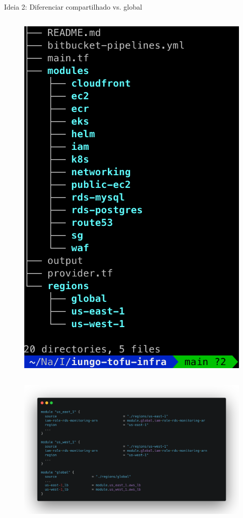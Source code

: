 \documentclass[aspectratio=169]{beamer}
\begin{document}
\begin{frame}{Ideia 2: Diferenciar compartilhado vs. global}
\begin{columns}[T]
\begin{column}[T]{5cm}
\begin{figure}
				\includegraphics[width=0.9\linewidth]{Images/tofu}
				
			\end{figure}
		\end{column}
	\end{columns}
	
\end{frame}


\begin{frame}

			\begin{figure}
				\centering
				\includegraphics[width=0.9\linewidth]{Images/hcl}
				
			\end{figure}
	
\end{frame}
\end{document}
